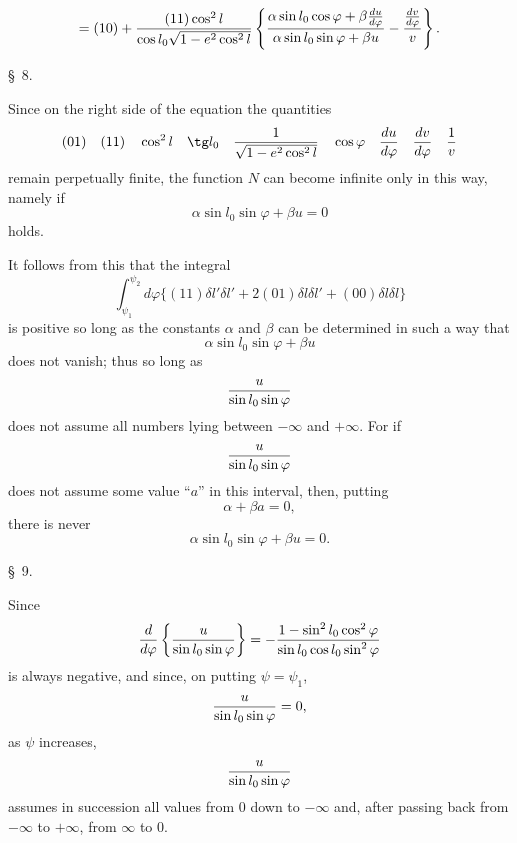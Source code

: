 \[
=(10)+{(11)\cos^2l\over \cos l_0\sqrt{1-e^2\cos^2l}}
\left\{{\alpha\sin l_0\cos\varphi+\beta{du\over d\varphi}
\over \alpha\sin l_0\sin\varphi+\beta u}
-{ {dv\over d\varphi}\over v}\right\}.
\]

\begin{center}\S\ 8.\end{center}

Since on the right side of the equation the quantities
\[
 (01)\quad (11)\quad \cos^2l\quad \tg l_0\quad {1\over \sqrt{1-e^2\cos^2l}}\quad
 \cos\varphi\quad {du\over d\varphi}\quad {dv\over d\varphi}\quad {1\over v}
\]
remain perpetually finite, the function $N$ can become infinite only in this way, namely if
\[
 \alpha\sin l_0\sin\varphi+\beta u=0
\]
holds.

It follows from this that the integral
\[
 \int_{\psi_1}^{\psi_2}d\varphi\{(11)\delta l'\delta l'+2(01)\delta l\delta l'+(00)\delta l\delta l\}
\]
is positive so long as the constants $\alpha$ and $\beta$ can be determined in such a way that
\[
 \alpha\sin l_0\sin\varphi+\beta u
\]
does not vanish; thus so long as
\[
 {u\over \sin l_0\sin\varphi}
\]
does not assume all numbers lying between $-\infty$ and $+\infty$. For if
\[
 {u\over \sin l_0\sin\varphi}
\]
does not assume some value ``$a$'' in this interval, then, putting
\[
 \alpha+\beta a=0,
\]
there is never
\[
 \alpha\sin l_0\sin\varphi+\beta u=0.
\]

\begin{center}\S\ 9.\end{center}

Since
\[
 {d\over d\varphi}\left\{ {u\over \sin l_0\sin\varphi}\right\}
 =-{1-\sin^2l_0\cos^2\varphi\over \sin l_0\cos l_0\sin^2\varphi}
\]
is always negative, and since, on putting $\psi=\psi_1$,
\[
 {u\over \sin l_0\sin\varphi}=0,
\]
as $\psi$ increases,
\[
 {u\over \sin l_0\sin\varphi}
\]
assumes in succession all values from $0$ down to $-\infty$ and, after passing back from $-\infty$ to $+\infty$, from $\infty$ to $0$.
